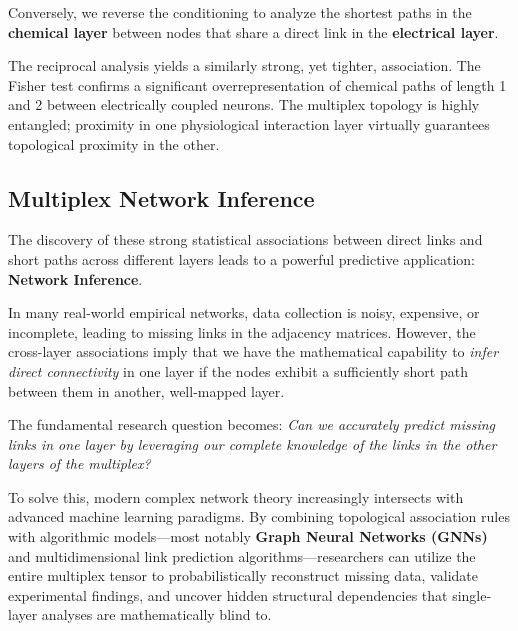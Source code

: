Conversely, we reverse the conditioning to analyze the shortest paths in the \textbf{chemical layer} between nodes that share a direct link in the \textbf{electrical layer}.



The reciprocal analysis yields a similarly strong, yet tighter, association. The Fisher test confirms a significant overrepresentation of chemical paths of length 1 and 2 between electrically coupled neurons. The multiplex topology is highly entangled; proximity in one physiological interaction layer virtually guarantees topological proximity in the other.

\subsection{Multiplex Network Inference}
\label{subsec:network_inference}

The discovery of these strong statistical associations between direct links and short paths across different layers leads to a powerful predictive application: \textbf{Network Inference}.

In many real-world empirical networks, data collection is noisy, expensive, or incomplete, leading to missing links in the adjacency matrices. However, the cross-layer associations imply that we have the mathematical capability to \textit{infer direct connectivity} in one layer if the nodes exhibit a sufficiently short path between them in another, well-mapped layer.

The fundamental research question becomes: \textit{Can we accurately predict missing links in one layer by leveraging our complete knowledge of the links in the other layers of the multiplex?}

To solve this, modern complex network theory increasingly intersects with advanced machine learning paradigms. By combining topological association rules with algorithmic models—most notably \textbf{Graph Neural Networks (GNNs)} and multidimensional link prediction algorithms—researchers can utilize the entire multiplex tensor to probabilistically reconstruct missing data, validate experimental findings, and uncover hidden structural dependencies that single-layer analyses are mathematically blind to.

